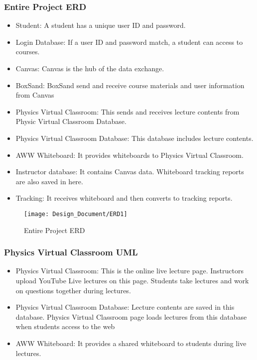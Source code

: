 \documentclass[10pt]{article}
\begin{document}
        \subsubsection{Entire Project ERD}
            \begin{itemize}
                \item Student: A student has a unique user ID and password.
                \item Login Database: If a user ID and password match, a student can access to courses.
                \item Canvas: Canvas is the hub of the data exchange.
                \item BoxSand: BoxSand send and receive course materials and user information from Canvas
                \item Physics Virtual Classroom: This sends and receives lecture contents from Physic Virtual Classroom Database.
                \item Physics Virtual Classroom Database: This database includes lecture contents.
                \item AWW Whiteboard: It provides whiteboards to Physics Virtual Classroom.
                \item Instructor database: It contains Canvas data. Whiteboard tracking reports are also saved in here.
                \item Tracking: It receives whiteboard and then converts to tracking reports.
            \end{itemize}

            \begin{figure}[!ht]
                \centering
                \texttt{[image: Design\_Document/ERD1]}
                \caption{Entire Project ERD}
            \end{figure}

\newpage
        \subsubsection{Physics Virtual Classroom UML}
            \begin{itemize}
                \item Physics Virtual Classroom: This is the online live lecture page. Instructors upload YouTube Live lectures on this page. Students take lectures and work on questions together during lectures.
                \item Physics Virtual Classroom Database: Lecture contents are saved in this database. Physics Virtual Classroom page loads lectures from this database when students access to the web
                \item AWW Whiteboard: It provides a shared whiteboard to students during live lectures.
            \end{itemize}
\end{document}
